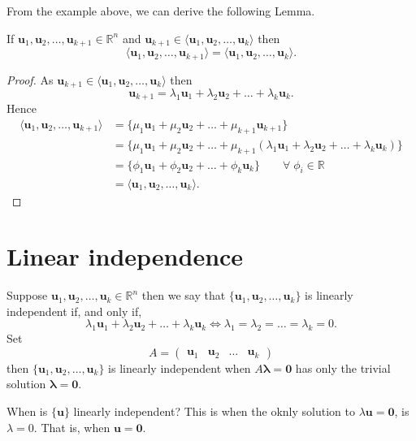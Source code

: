 From the example above, we can derive the following Lemma.

\begin{lemma}
    If $\bm u_1, \bm u_2, \ldots, \bm u_{k+1} \in \mathbb R^n$ and $\bm u_{k+1} \in \langle \bm u_1, \bm u_2, \ldots, \bm u_k \rangle$ then \[\langle \bm u_1, \bm u_2, \ldots, \bm u_{k+1} \rangle = \langle \bm u_1, \bm u_2, \ldots, \bm u_k \rangle.\]
\end{lemma}

\begin{proof}
    As $\bm u_{k+1}\in\langle \bm u_1, \bm u_2, \ldots, \bm u_k \rangle$ then \[\bm{u}_{k+1} = \lambda_1 \bm{u}_1 + \lambda_2 \bm{u}_2 + \ldots + \lambda_k \bm{u}_k.\] Hence
    \begin{align*}
        \langle \bm{u}_1, \bm{u}_2, \ldots, \bm{u}_{k+1} \rangle &= \{\mu_1 \bm{u}_1 + \mu_2 \bm{u}_2 + \ldots + \mu_{k+1} \bm{u}_{k+1}\} \\
        &= \{\mu_1 \bm u_1 + \mu_2 \bm u_2 + \ldots + \mu_{k+1} (\lambda_1 \bm{u}_1 + \lambda_2 \bm{u}_2 + \ldots + \lambda_k \bm{u}_k)\} \\ 
        &= \{\phi_1 \bm{u}_1 + \phi_2 \bm{u}_2 + \ldots + \phi_k \bm{u}_k\} \qquad \forall \; \phi_i \in \mathbb R \\
        &= \langle \bm{u}_1, \bm{u}_2, \ldots, \bm{u}_k \rangle.
    \end{align*}
\end{proof}

\section{Linear independence}

\begin{definition}
    Suppose $\bm{u}_1, \bm{u}_2, \ldots, \bm{u}_k \in \mathbb R^n$ then we say that $\{\bm{u}_1, \bm{u}_2, \ldots, \bm{u}_k\}$ is linearly independent if, and only if, \[\lambda_1 \bm{u}_1 + \lambda_2 \bm{u}_2 + \ldots + \lambda_k \bm{u}_k \iff \lambda_1 = \lambda_2 = \ldots = \lambda_k = 0.\] Set 
    \[
        A=
        \begin{pmatrix}
            \bm{u}_1 & \bm{u}_2 & \ldots & \bm{u}_k
        \end{pmatrix}
    \]
    then $\{\bm{u}_1, \bm{u}_2, \ldots, \bm{u}_k\}$ is linearly independent when $A \bm{\lambda} = \bm{0}$ has only the trivial solution $\bm{\lambda} = \bm{0}$.
\end{definition}

\begin{example}
    When is $\{\bm{u}\}$ linearly independent? This is when the oknly solution to $\lambda \bm{u} = \bm{0}$, is $\lambda = 0$. That is, when $\bm{u} = \bm{0}$.
\end{example}

